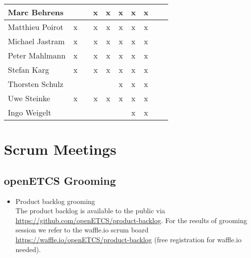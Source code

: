 \documentclass[a4paper, 11pt]{article}
\begin{document}
\begin{tabular}{|l|c|c|c|c|c|c|c||c|c|}
Marc Behrens          &   &   & x & x & x & x & x  \\\hline
Matthieu Poirot       & x &   & x & x & x & x & x  \\\hline
Michael Jastram       & x &   & x & x & x & x & x  \\\hline
Peter Mahlmann        & x &   & x & x & x & x & x \\\hline
Stefan Karg           & x &   & x  & x & x & x & x \\\hline
Thorsten Schulz       &   &   &   &  & x & x & x \\\hline
Uwe Steinke           & x &   & x & x & x & x & x \\\hline
Ingo Weigelt          &   &   &   &   &   & x & x  \\\hline
\end{tabular}


\section{Scrum Meetings}

\subsection{openETCS Grooming}
\begin{itemize}
\item Product backlog grooming\\
The product backlog is available to the public via 
\url{https://github.com/openETCS/product-backlog}. For the results of grooming session we refer to the waffle.io scrum board \url{https://waffle.io/openETCS/product-backlog} (free registration for waffle.io needed).
\end{itemize}
\end{document}
